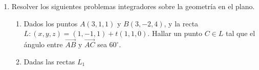 \documentclass[a4paper]{article}
\newcommand{\exercise}{\item}
\begin{document}
\begin{enumerate}
\begin{enumerate} [label=(\alph*)]
		\item $\pi_1: 2x-4y+8z=3$ y $\pi_2: 6x-12y+24z=9$.
		\item $r_1: (x,y,z)=(4,0,2)+t(2,4,6)$ y $\pi_2: 6x-12y+24z=9$
		\item $\pi_1: 2x-4y+8z=3$ y $r_2: (x,y,z)=(2,2,-1)+t(-3,2,1)$
	\end{enumerate}
	\exercise Resolver los siguientes problemas integradores sobre la geometría en el plano.
	\begin{enumerate} [label=(\alph*)]
		\item Dados los puntos $A(3,1,1)$ y $B(3,-2,4)$, y la recta $L: (x,y,z)=(1,-1,1)+t(1,1,0)$. Hallar un punto $C\in L$ tal que el ángulo entre $\overrightarrow{AB}$ y $\overrightarrow{AC}$ sea $60^{\circ}$.
		\item Dadas las rectas $L_1$
	\end{enumerate}
\end{enumerate}
\vspace{20pt} 
\end{document}
